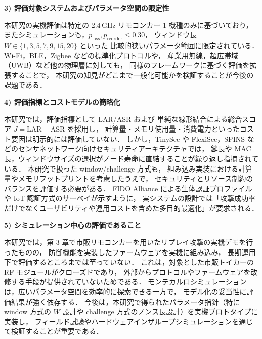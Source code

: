 \documentclass[twocolumn,10pt,a4paper]{jsarticle}
\begin{document}
\vspace{0.5em}
\noindent\textbf{3) 評価対象システムおよびパラメータ空間の限定性}\par
本研究の実機評価は特定の 2.4\,GHz リモコンカー 1 機種のみに基づいており，
またシミュレーションも，$p_{\mathrm{loss}}, p_{\mathrm{reorder}} \le 0.30$，
ウィンドウ長 $W \in \{1,3,5,7,9,15,20\}$ といった
比較的狭いパラメータ範囲に限定されている．
Wi\mbox{-}Fi，BLE，Zigbee などの標準化プロトコルや，
産業用無線，超広帯域（UWB）など他の物理層に対しても，
同様のフレームワークに基づく評価を拡張することで，
本研究の知見がどこまで一般化可能かを検証することが今後の課題である\cite{ElHajj2019IoTAuth,Anthi2024RFVuln,Lazzaro2024}．

\vspace{0.5em}
\noindent\textbf{4) 評価指標とコストモデルの簡略化}\par
本研究では，評価指標として LAR/ASR および
単純な線形結合による総合スコア $J = \mathrm{LAR} - \mathrm{ASR}$ を採用し，
計算量・メモリ使用量・消費電力といったコスト要因は明示的には評価していない．
しかし，TinySec や FlexiSec，SPINS などのセンサネットワーク向けセキュリティアーキテクチャ\cite{TinySec,JinwalaFlexiSec,PerrigSPINS}では，
鍵長や MAC 長，ウィンドウサイズの選択がノード寿命に直結することが繰り返し指摘されている．
本研究で扱った window/challenge 方式も，
組み込み実装における計算量やメモリフットプリントを考慮したうえで，
セキュリティとリソース制約のバランスを評価する必要がある．
FIDO Alliance による生体認証プロファイル\cite{FIDO-Bio,fido-security-ref}や
IoT 認証方式のサーベイ\cite{ElHajj2019IoTAuth}が示すように，
実システムの設計では「攻撃成功率だけでなくユーザビリティや運用コストを含めた多目的最適化」が要求される．

\vspace{0.5em}
\noindent\textbf{5) シミュレーション中心の評価であること}\par
本研究では，第 3 章で市販リモコンカーを用いたリプレイ攻撃の実機デモを行ったものの，
防御機能を実装したファームウェアを実機に組み込み，
長期運用下で評価するところまでは至っていない．
これは，対象とした市販トイカーの RF モジュールがクローズドであり，
外部からプロトコルやファームウェアを改修する手段が提供されていないためである．
モンテカルロシミュレーションは，広いパラメータ空間を効率的に探索できる一方で，
モデル化の妥当性に評価結果が強く依存する\cite{Raychaudhuri2008MC,Law2015Simulation,Kleijnen1995VV,Sargent2013VVA}．
今後は，本研究で得られたパラメータ指針（特に window 方式の $W$ 設計や
challenge 方式のノンス長設計）を実機プロトタイプに実装し，
フィールド試験やハードウェアインザループシミュレーションを通じて検証することが重要である．
\end{document}
